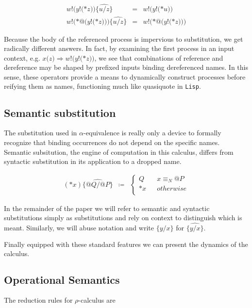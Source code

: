 \documentclass[]{amsart}
\makeatletter
\newcommand{\id}[1]{\texttt{#1}}
\newcommand{\juxtap}{\mathbin{\id{|}}}
\newcommand{\concat}{\Rightarrow}
\newcommand{\nameeq}{\mathbin{\equiv_N}}
\newcommand{\quotep}[1]{@#1}
\newcommand{\dropn}[1]{*#1}
\newcommand{\substp}[2]{\id{\{} \quotep{#1} / \quotep{#2} \id{\}}}
\newcommand{\substn}[2]{\id{\{} #1 / #2 \id{\}}}
\newcommand{\psubstp}[2]{\widehat{\substp{#1}{#2}}}
\newcommand{\psubstn}[2]{\widehat{\substn{#1}{#2}}}
\newcommand{\defneqls}{\coloneqq}
\newcommand{\red}{\rightarrow}
\theoremstyle{definition}
\theoremstyle{remark}
\numberwithin{equation}{subsection}
\newcommand{\rhoc}{$\rho$-calculus}
\makeatother
\begin{document}
\begin{eqnarray*}
	{w}{!}{(}{y}{!}{(}{*}{z}{)}{)}\widehat{{\{}u / z{\}}}
		& = &
		{w}{!}{(}{y}{!}{(}{*}u{)}{)} \\
       {w}{!}{(}{*}{@}({y}{!}{(}{*z}{)}{)}{)}\widehat{{\{}u / z{\}} }
		& = &
		{w}{!}{(}{*}{@}({y}{!}{(}{*z}{)}{)}{)}
\end{eqnarray*}

Because the body of the referenced process is impervious to
substitution, we get radically different answers. In fact, by
examining the first process in an input context, e.g. $x{(}{z}{)}
\Rightarrow {w}{!}{(}{y}{!}{(}{*}{z}{)}{)}$, we see that combinations
of reference and dereference may be shaped by prefixed inputs binding
dereferenced names. In this sense, these operators provide a means to
dynamically construct processes before reifying them as names,
functioning much like quasiquote in {\tt Lisp}.

\subsection{Semantic substitution}

The substitution used in $\alpha$-equivalence is really only a device
to formally recognize that binding occurrences do not depend on the
specific names. Semantic subsitution, the engine of computation in
this calculus, differs from syntactic substitution in its application
to a dropped name.

\begin{eqnarray*}
(\dropn{x})  \psubstp{Q}{P}       
		& \defneqls & 
		\left\{ 
			\begin{array}{ccc} 
				Q & & x \nameeq \quotep{P} \\
                              	\dropn{x} & & otherwise \\
			\end{array}
		\right.
\end{eqnarray*}

In the remainder of the paper we will refer to semantic and syntactic
substitutions simply as substitutions and rely on context to
distinguish which is meant. Similarly, we will abuse notation and
write $\substn{y}{x}$ for $\psubstn{y}{x}$.

Finally equipped with these standard features we can present the
dynamics of the calculus.

\subsection{Operational Semantics}
The reduction rules for {\rhoc}  are
\end{document}
